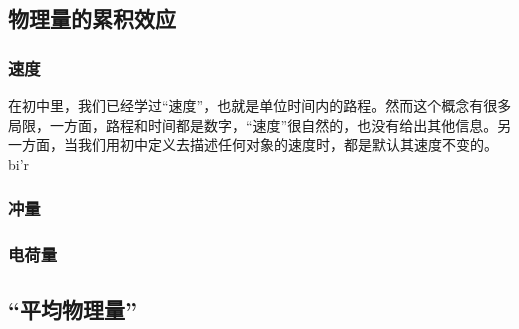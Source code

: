 
\subsection{物理量的累积效应}
\subsubsection{速度}
在初中里，我们已经学过“速度”，也就是单位时间内的路程。然而这个概念有很多局限，一方面，路程和时间都是数字，“速度”很自然的，也没有给出其他信息。另一方面，当我们用初中定义去描述任何对象的速度时，都是默认其速度不变的。bi'r
\subsubsection{冲量}
\subsubsection{电荷量}
\subsection{“平均物理量”}